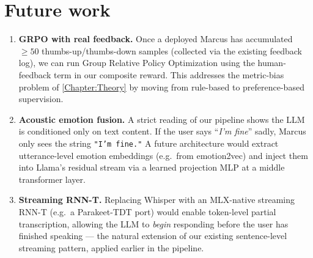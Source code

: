 \documentclass{ecsproject}
\begin{document}
\section{Future work}
\begin{enumerate}
    \item \textbf{GRPO with real feedback.} Once a deployed Marcus has
    accumulated $\geq 50$ thumbs-up/thumbs-down samples
    (collected via the existing feedback log), we can run
    Group Relative Policy Optimization \citep{shao2024deepseekmath}
    using the human-feedback term in our composite reward. This
    addresses the metric-bias problem of \cref{Chapter:Theory} by
    moving from rule-based to preference-based supervision.
    \item \textbf{Acoustic emotion fusion.} A strict reading of our
    pipeline shows the LLM is conditioned only on text content. If
    the user says ``\emph{I'm fine}'' sadly, Marcus only sees the
    string \texttt{"I'm fine."} A future architecture would extract
    utterance-level emotion embeddings (e.g.\ from emotion2vec) and
    inject them into Llama's residual stream via a learned projection
    MLP at a middle transformer layer.
    \item \textbf{Streaming RNN-T.} Replacing Whisper with an
    MLX-native streaming RNN-T (e.g.\ a Parakeet-TDT port) would
    enable token-level partial transcription, allowing the LLM to
    \emph{begin} responding before the user has finished speaking ---
    the natural extension of our existing sentence-level streaming
    pattern, applied earlier in the pipeline.
\end{enumerate}



\end{document}
